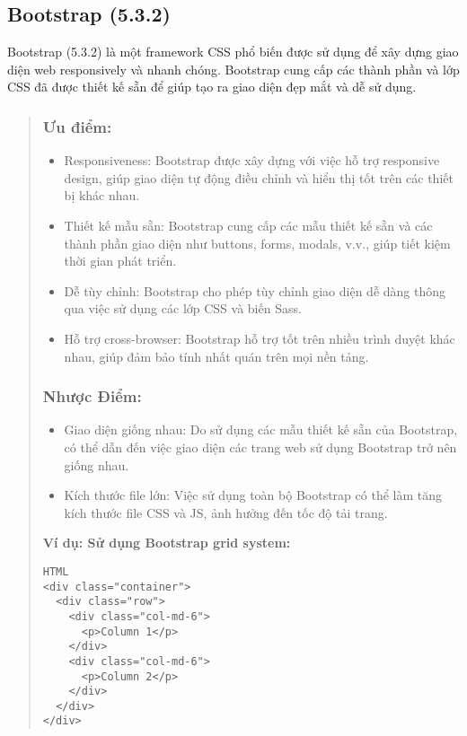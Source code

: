 \subsection{Bootstrap (5.3.2)}

Bootstrap (5.3.2) là một framework CSS phổ biến được sử dụng để xây dựng giao diện web responsively và nhanh chóng. Bootstrap cung cấp các thành phần và lớp CSS đã được thiết kế sẵn để giúp tạo ra giao diện đẹp mắt và dễ sử dụng.

\begin{quote}
\subsubsection{Ưu điểm:}
\begin{itemize}
  \item Responsiveness: Bootstrap được xây dựng với việc hỗ trợ responsive design, giúp giao diện tự động điều chỉnh và hiển thị tốt trên các thiết bị khác nhau.
  \item Thiết kế mẫu sẵn: Bootstrap cung cấp các mẫu thiết kế sẵn và các thành phần giao diện như buttons, forms, modals, v.v., giúp tiết kiệm thời gian phát triển.
  \item Dễ tùy chỉnh: Bootstrap cho phép tùy chỉnh giao diện dễ dàng thông qua việc sử dụng các lớp CSS và biến Sass.
  \item Hỗ trợ cross-browser: Bootstrap hỗ trợ tốt trên nhiều trình duyệt khác nhau, giúp đảm bảo tính nhất quán trên mọi nền tảng.
\end{itemize}

\subsubsection{Nhược Điểm:}
\begin{itemize}
  \item Giao diện giống nhau: Do sử dụng các mẫu thiết kế sẵn của Bootstrap, có thể dẫn đến việc giao diện các trang web sử dụng Bootstrap trở nên giống nhau.
  \item Kích thước file lớn: Việc sử dụng toàn bộ Bootstrap có thể làm tăng kích thước file CSS và JS, ảnh hưởng đến tốc độ tải trang.
\end{itemize}
\textbf{Ví dụ: Sử dụng Bootstrap grid system:}
\begin{lstlisting}
HTML
<div class="container">
  <div class="row">
    <div class="col-md-6">
      <p>Column 1</p>
    </div>
    <div class="col-md-6">
      <p>Column 2</p>
    </div>
  </div>
</div>
\end{lstlisting}
\end{quote}


